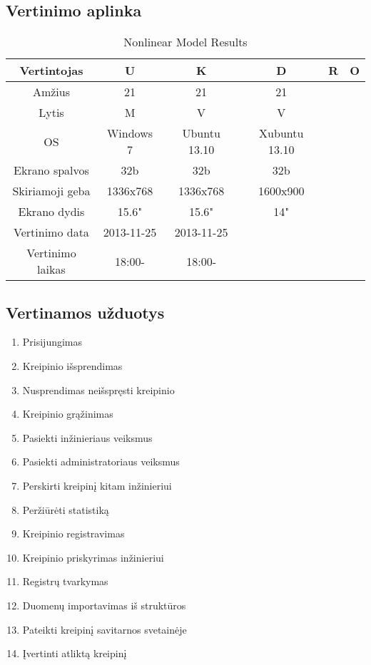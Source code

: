 \subsection{Vertinimo aplinka}
	\begin{table}[ht] 
	\caption{Nonlinear Model Results} %
	\centering %
	\begin{tabular}{c c c c c c} %
	\hline\hline %
	Vertintojas & U & K & D & R & O \\ [0.5ex] %
	\hline %
	Amžius & 21 & 21 & 21\\ %
	Lytis & M & V & V\\
	OS & Windows 7 & Ubuntu 13.10 & Xubuntu 13.10\\
	Ekrano spalvos & 32b & 32b & 32b\\
	Skiriamoji geba & 1336x768 & 1336x768 & 1600x900\\
	Ekrano dydis & 15.6" & 15.6" & 14"\\
	Vertinimo data & 2013-11-25 & 2013-11-25\\
	Vertinimo laikas & 18:00- & 18:00-\\
	\hline %
	\end{tabular} 
	\label{table:nonlin} %
	\end{table} 
	
\subsection{Vertinamos užduotys}
	\begin{enumerate}
	\item Prisijungimas
	\item Kreipinio išsprendimas
	\item Nusprendimas neišspręsti kreipinio
	\item Kreipinio grąžinimas
	\item Pasiekti inžinieriaus veiksmus
	\item Pasiekti administratoriaus veiksmus
	\item Perskirti kreipinį kitam inžinieriui
	\item Peržiūrėti statistiką
	\item Kreipinio registravimas
	\item Kreipinio priskyrimas inžinieriui
	\item Registrų tvarkymas
	\item Duomenų importavimas iš struktūros
	\item Pateikti kreipinį savitarnos svetainėje
	\item Įvertinti atliktą kreipinį
	\end{enumerate}
	
